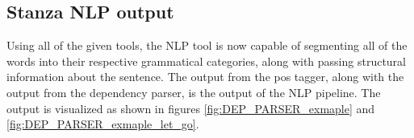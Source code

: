 \subsection{Stanza NLP output} \label{sec:stanzaOutput}
Using all of the given tools, the NLP tool is now capable of segmenting all of the words into their respective grammatical categories, along with passing structural information about the sentence. The output from the pos tagger, along with the output from the dependency parser, is the output of the NLP pipeline. The output is visualized as shown in figures \ref{fig:DEP_PARSER_exmaple} and \ref{fig:DEP_PARSER_exmaple_let_go}.
